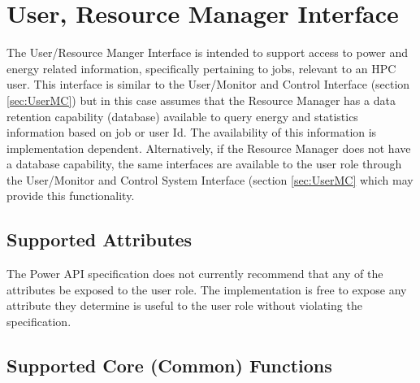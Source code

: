 \documentclass[12pt]{report} %
\providecommand{\DIFdelbegin}{} %
\providecommand{\DIFdelend}{} %
\newcommand{\DIFscaledelfig}{0.5}
\newlength{\DIFdelgraphicswidth} %
\newlength{\DIFdelgraphicsheight} %
\newcommand{\DIFdelincludegraphics}[2][]{%
\sbox{\DIFdelgraphicsbox}{\DIFOincludegraphics[#1]{#2}}%
\settoboxwidth{\DIFdelgraphicswidth}{\DIFdelgraphicsbox} %
\settoboxtotalheight{\DIFdelgraphicsheight}{\DIFdelgraphicsbox} %
\scalebox{\DIFscaledelfig}{%
\parbox[b]{\DIFdelgraphicswidth}{\usebox{\DIFdelgraphicsbox}\\[-\baselineskip] \rule{\DIFdelgraphicswidth}{0em}}\llap{\resizebox{\DIFdelgraphicswidth}{\DIFdelgraphicsheight}{%
\setlength{\unitlength}{\DIFdelgraphicswidth}%
\begin{picture}(1,1)%
\thicklines\linethickness{2pt} %
{\color[rgb]{1,0,0}\put(0,0){\framebox(1,1){}}}%
{\color[rgb]{1,0,0}\put(0,0){\line( 1,1){1}}}%
{\color[rgb]{1,0,0}\put(0,1){\line(1,-1){1}}}%
\end{picture}%
}\hspace*{3pt}}} %
} %
\DeclareRobustCommand{\DIFdelbegin}{\DIFOdelbegin \let\includegraphics\DIFdelincludegraphics} %
\DeclareRobustCommand{\DIFdelend}{\DIFOaddend \let\includegraphics\DIFOincludegraphics} %
\begin{document}
\DIFdelend \newpage
\section{User, Resource Manager Interface}\label{sec:UserRM}
The User/Resource Manger Interface is intended to support access to power and energy related information, specifically pertaining to jobs, relevant to an HPC user.
This interface is similar to the User/Monitor and Control Interface (section \ref{sec:UserMC}) but in this case assumes that the Resource Manager has a data retention capability (database) available to query energy and statistics information based on job or user Id.
The availability of this information is implementation dependent.
Alternatively, if the Resource Manager does not have a database capability, the same interfaces are available to the user role through the User/Monitor and Control System Interface (section \ref{sec:UserMC} which may provide this functionality.

\DIFdelbegin %

\DIFdelend \subsection{Supported Attributes}\label{sec:UserRMAttributes}
The Power API specification does not currently recommend that any of the attributes be exposed to the user role. 
The implementation is free to expose any attribute they determine is useful to the user role without violating the specification.

\subsection{Supported Core (Common) Functions}\label{sec:UserRMSupportedCommon}

\DIFdelbegin %
\end{document}
